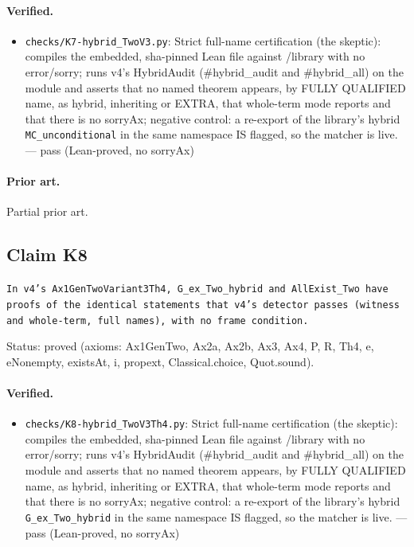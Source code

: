 \documentclass{article}
\begin{document}
\paragraph{Verified.}
\begin{itemize}
\item \texttt{checks/K7-hybrid\_TwoV3.py}: Strict full-name certification (the skeptic): compiles the embedded, sha-pinned Lean file against /library with no error/sorry; runs v4's HybridAudit (\#hybrid\_audit and \#hybrid\_all) on the module and asserts that no named theorem appears, by FULLY QUALIFIED name, as hybrid, inheriting or EXTRA, that whole-term mode reports and that there is no sorryAx; negative control: a re-export of the library's hybrid \texttt{MC\_unconditional} in the same namespace IS flagged, so the matcher is live. --- pass (Lean-proved, no sorryAx)
\end{itemize}

\paragraph{Prior art.} Partial prior art.

\subsection*{Claim K8}

\texttt{In v4's Ax1GenTwoVariant3Th4, G\_ex\_Two\_hybrid and AllExist\_Two have proofs of the identical statements that v4's detector passes (witness and whole-term, full names), with no frame condition.}

Status: proved (axioms: Ax1GenTwo, Ax2a, Ax2b, Ax3, Ax4, P, R, Th4, e, eNonempty, existsAt, i, propext, Classical.choice, Quot.sound).

\paragraph{Verified.}
\begin{itemize}
\item \texttt{checks/K8-hybrid\_TwoV3Th4.py}: Strict full-name certification (the skeptic): compiles the embedded, sha-pinned Lean file against /library with no error/sorry; runs v4's HybridAudit (\#hybrid\_audit and \#hybrid\_all) on the module and asserts that no named theorem appears, by FULLY QUALIFIED name, as hybrid, inheriting or EXTRA, that whole-term mode reports and that there is no sorryAx; negative control: a re-export of the library's hybrid \texttt{G\_ex\_Two\_hybrid} in the same namespace IS flagged, so the matcher is live. --- pass (Lean-proved, no sorryAx)
\end{itemize}
\end{document}
